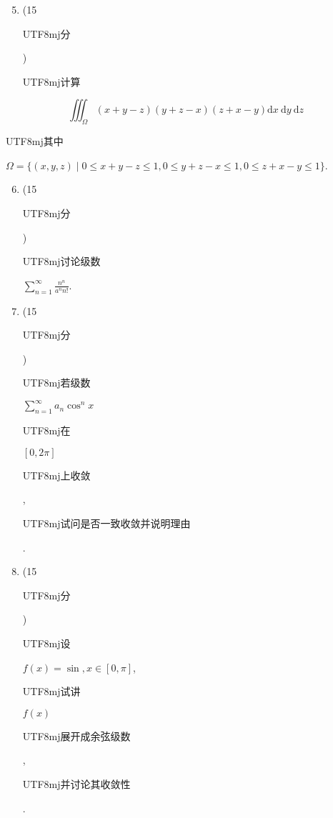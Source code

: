 \documentclass[10pt]{article}
\begin{document}
\begin{enumerate}
  \setcounter{enumi}{4}
  \item (15 \begin{CJK}{UTF8}{mj}分\end{CJK}) \begin{CJK}{UTF8}{mj}计算\end{CJK}
\end{enumerate}
$$
\iiint_{\Omega}(x+y-z)(y+z-x)(z+x-y) \mathrm{d} x \mathrm{~d} y \mathrm{~d} z
$$
\begin{CJK}{UTF8}{mj}其中\end{CJK} $\Omega=\{(x, y, z) \mid 0 \leq x+y-z \leq 1,0 \leq y+z-x \leq 1,0 \leq z+x-y \leq 1\}$.

\begin{enumerate}
  \setcounter{enumi}{5}
  \item (15 \begin{CJK}{UTF8}{mj}分\end{CJK}) \begin{CJK}{UTF8}{mj}讨论级数\end{CJK} $\sum_{n=1}^{\infty} \frac{n^{n}}{a^{n} n !}$.

  \item (15 \begin{CJK}{UTF8}{mj}分\end{CJK}) \begin{CJK}{UTF8}{mj}若级数\end{CJK} $\sum_{n=1}^{\infty} a_{n} \cos ^{n} x$ \begin{CJK}{UTF8}{mj}在\end{CJK} $[0,2 \pi]$ \begin{CJK}{UTF8}{mj}上收敛\end{CJK}, \begin{CJK}{UTF8}{mj}试问是否一致收敛并说明理由\end{CJK}.

  \item (15 \begin{CJK}{UTF8}{mj}分\end{CJK}) \begin{CJK}{UTF8}{mj}设\end{CJK} $f(x)=\sin , x \in[0, \pi]$, \begin{CJK}{UTF8}{mj}试讲\end{CJK} $f(x)$ \begin{CJK}{UTF8}{mj}展开成余弦级数\end{CJK}, \begin{CJK}{UTF8}{mj}并讨论其收敛性\end{CJK}.


\end{enumerate}
\end{document}
